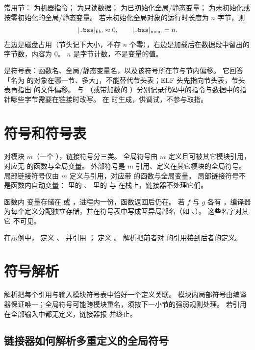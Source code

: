 常用节： 为机器指令； 为只读数据； 为已初始化全局/静态变量； 为未初始化或按零初始化的全局/静态变量。
若未初始化全局对象的运行时长度为 $n$ 字节，则
\[
\lvert\text{\texttt{.bss}}\rvert_{\text{file}}\approx 0,
\qquad
\lvert\text{\texttt{.bss}}\rvert_{\text{mem}}=n.
\]
左边是磁盘占用（节头记下大小，不存 $n$ 个零），右边是加载后在数据段中留出的字节数，内容为 $0$。
$n$ 是字节计数，不是变量的值。

 是符号表：函数名、全局/静态变量名，以及该符号所在节与节内偏移。
它回答「名为  的对象在哪一节、多大」，不能替代节头表；ELF 头先指向节头表，节头表再指出  的文件偏移。
 与 （或带加数的 ）分别记录代码中的指令与数据中的指针哪些字节需要在链接时改写。
 在  时生成，供调试，不参与取指。

\section{符号和符号表}

对模块 $m$（一个 ），链接符号分三类。
全局符号由 $m$ 定义且可被其它模块引用，对应无  的函数与全局变量。
外部符号是 $m$ 引用、定义在其它模块的全局符号。
局部链接符号仅由 $m$ 定义与引用，对应带  的函数与全局变量。
局部链接符号不是函数内自动变量： 里的 、 里的  与  在栈上，链接器不处理它们。

函数内  变量存储在  或 ，进程内一份，函数返回后仍在。
若 $f$ 与 $g$ 各有 ，编译器为每个定义分配独立存储，并在符号表中写成互异局部名（如 、）。
这些名字对其它  不可见。

在示例中， 定义 、 并引用 ； 定义 。
解析把前者对  的引用接到后者的定义。

\section{符号解析}

解析把每个引用与输入模块符号表中恰好一个定义关联。
模块内局部符号由编译器保证唯一；全局符号可能跨模块重名，须按下一小节的强弱规则处理。
若引用在全部输入中都无定义，链接器报  并终止。

\subsection{链接器如何解析多重定义的全局符号}

